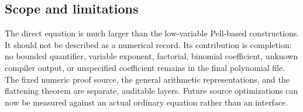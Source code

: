 \subsection{Scope and limitations}

The direct equation is much larger than the low-variable Pell-based
constructions. It should not be described as a numerical record.
Its contribution is completion: no bounded quantifier, variable exponent,
factorial, binomial coefficient, unknown compiler output, or unspecified
coefficient remains in the final polynomial file. The fixed numeric proof
source, the general arithmetic representations, and the flattening theorem
are separate, auditable layers. Future source optimizations can now be
measured against an actual ordinary equation rather than an interface.
